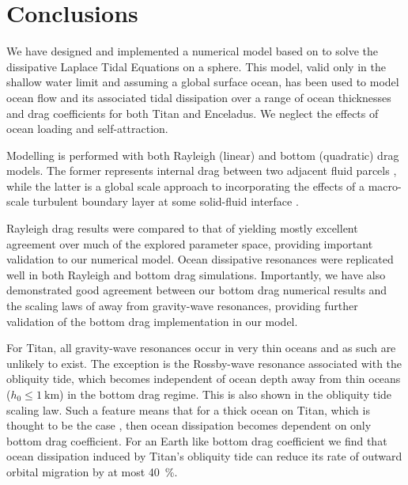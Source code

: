 \section{Conclusions}

We have designed and implemented a numerical model based on \citet{sears1995tidal} to solve the dissipative Laplace Tidal Equations on a sphere. This model, valid only in the shallow water limit and assuming a global surface ocean, has been used to model ocean flow and its associated tidal dissipation over a range of ocean thicknesses and drag coefficients for both Titan and Enceladus. We neglect the effects of ocean loading and self-attraction.

Modelling is performed with both Rayleigh (linear) and bottom (quadratic) drag models. The former represents internal drag between two adjacent fluid parcels \citep{neumann1968ocean}, while the latter is a global scale approach to incorporating the effects of a macro-scale turbulent boundary layer at some solid-fluid interface \citep{gill1982atmosphere}.

Rayleigh drag results were compared to that of \citet{matsuyama2014tidal} yielding mostly excellent agreement over much of the explored parameter space, providing important validation to our numerical model. Ocean dissipative resonances were replicated well in both Rayleigh and bottom drag simulations. Importantly, we have also demonstrated good agreement between our bottom drag numerical results and the scaling laws of \citet{chen2013tidal} away from gravity-wave resonances, providing further validation of the bottom drag implementation in our model.

For Titan, all gravity-wave resonances occur in very thin oceans and as such  are unlikely to exist. The exception is the Rossby-wave resonance associated with the obliquity tide, which becomes independent of ocean depth away from thin oceans ($h_0 \leqslant\SI{1}{\kilo\metre}$) in the bottom drag regime. This is also shown in the \citet{chen2013tidal} obliquity tide scaling law. Such a feature means that for a thick ocean on Titan, which is thought to be the case \citep{sohl2014structural}, then ocean dissipation becomes dependent on only bottom drag coefficient. For an Earth like bottom drag coefficient we find that ocean dissipation induced by Titan's obliquity tide can reduce its rate of outward orbital migration by at most \SI{40}{\percent}. 


